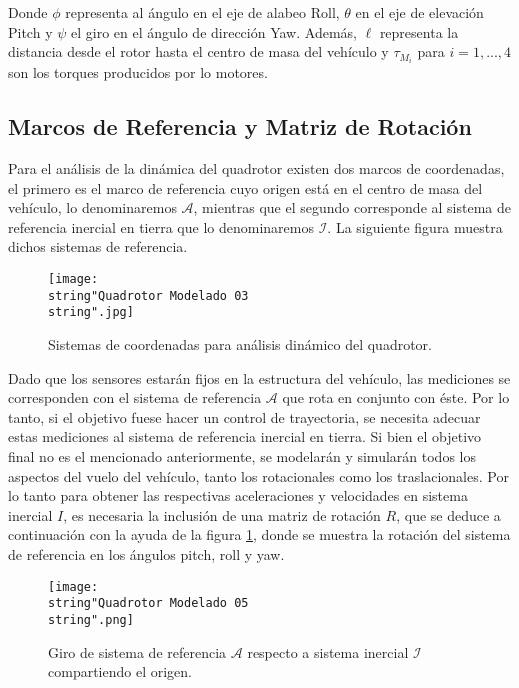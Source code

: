 \documentclass[../main.tex]{subfiles}
\begin{document}
Donde $\phi$ representa al ángulo en el eje de alabeo Roll, $\theta$ en el eje de elevación Pitch y $\psi$ el giro en el ángulo de dirección Yaw. Además, $\ell$ representa la distancia desde el rotor hasta el centro
de masa del vehículo y $\tau_{M_{i}}$ para $i=1,...,4$ son los torques
producidos por lo motores.

\subsection{Marcos de Referencia y Matriz de Rotación}

Para el análisis de la dinámica del quadrotor existen dos marcos de
coordenadas, el primero es el marco de referencia cuyo origen está
en el centro de masa del vehículo, lo denominaremos $\mathcal{A}$,
mientras que el segundo corresponde al sistema de referencia inercial
en tierra que lo denominaremos $\mathcal{I}$. La siguiente figura
muestra dichos sistemas de referencia. 

\noindent \begin{center}
\begin{figure}[H]
\noindent \begin{centering}
\texttt{[image: \\string"Quadrotor Modelado 03\\string".jpg]}
\par\end{centering}
\caption{Sistemas de coordenadas para análisis dinámico del quadrotor.}
\end{figure}
\par\end{center}

Dado que los sensores estarán fijos en la estructura del vehículo,
las mediciones se corresponden con el sistema de referencia $\mathcal{A}$
que rota en conjunto con éste. Por lo tanto, si el objetivo fuese
hacer un control de trayectoria, se necesita adecuar estas mediciones
al sistema de referencia inercial en tierra. Si bien el objetivo final
no es el mencionado anteriormente, se modelarán y simularán todos
los aspectos del vuelo del vehículo, tanto los rotacionales como los
traslacionales. Por lo tanto para obtener las respectivas aceleraciones
y velocidades en sistema inercial $I$, es necesaria la inclusión
de una matriz de rotación $R$, que se deduce a continuación con la
ayuda de la figura \ref{fig:Giro-de-sistema}, donde se muestra la
rotación del sistema de referencia en los ángulos pitch, roll y
yaw.

\begin{figure}[H]
\noindent \begin{centering}
\texttt{[image: \\string"Quadrotor Modelado 05\\string".png]}
\par\end{centering}
\caption{\label{fig:Giro-de-sistema}Giro de sistema de referencia $\mathcal{A}$
respecto a sistema inercial $\mathcal{I}$ compartiendo el origen.}
\end{figure}
\end{document}
